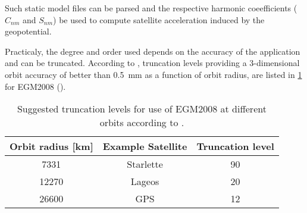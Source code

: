 Such static model files can be parsed and the respective harmonic coeefficients 
(\(C_{nm}\) and \(S_{nm}\)) be used to compute satellite acceleration induced by 
the geopotential.

Practicaly, the degree and order used depends on the accuracy of the 
application and can be truncated. According to \cite{iers2010}, truncation levels 
providing a 3-dimensional orbit accuracy of better than \SI{0.5}{\mm} as a 
function of orbit radius, are listed in \ref{table:egm2008-truncation-levels} 
for EGM2008 (\cite{pavlisegm08}).

\begin{table}
\centering
\begin{tabular}{c c c}
 \hline
 Orbit radius [km] & Example Satellite & Truncation level \\
 \hline
  7331  & Starlette & 90 \\
  12270 & Lageos    & 20 \\
  26600 & GPS       & 12 \\
 \hline
\end{tabular}
\caption{Suggested truncation levels for use of EGM2008 at different orbits according to \cite{iers2010}.}
\label{table:egm2008-truncation-levels}
\end{table}
\fi
